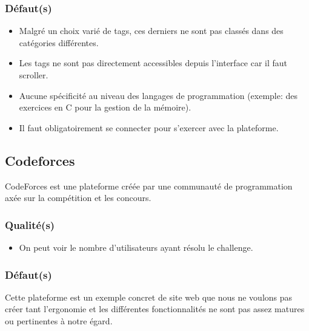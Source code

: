 \subsubsection*{Défaut(s)}

\begin{itemize}
    \item Malgré un choix varié de \glspl{tag}, ces derniers ne sont pas classés dans des catégories différentes.
    \item Les \glspl{tag} ne sont pas directement accessibles depuis l'interface car il faut scroller.
    \item Aucune spécificité au niveau des langages de programmation (exemple: des exercices en C pour la gestion de la mémoire).
    \item Il faut obligatoirement se connecter pour s'exercer avec la plateforme.
\end{itemize}

\subsection*{Codeforces}

CodeForces est une plateforme créée par une communauté de programmation axée sur la compétition et les concours.

\subsubsection*{Qualité(s)}

\begin{itemize}
    \item On peut voir le nombre d'utilisateurs ayant résolu le challenge.
\end{itemize}

\subsubsection*{Défaut(s)}

Cette plateforme est un exemple concret de site web que nous ne voulons pas créer tant l'ergonomie et les différentes fonctionnalités ne sont pas assez matures ou pertinentes à notre égard.\\

